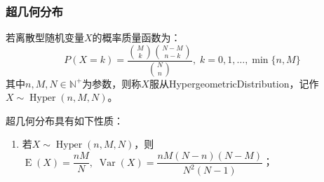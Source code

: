 \subsubsection{超几何分布}
\begin{definition}
	若离散型随机变量$X$的概率质量函数为：
	\begin{equation*}
		P(X=k)=\frac{\binom{M}{k}\binom{N-M}{n-k}}{\binom{N}{n}},\;k=0,1,\dots,\min\{n,M\}
	\end{equation*}
	其中$n,M,N\in\mathbb{N}^+$为参数，则称$X$服从\gls{HypergeometricDistribution}，记作$X\sim\operatorname{Hyper}(n,M,N)$。
\end{definition}
\begin{property}
	超几何分布具有如下性质：
	\begin{enumerate}
		\item 若$X\sim\operatorname{Hyper}(n,M,N)$，则$\operatorname{E}(X)=\dfrac{nM}{N},\;\operatorname{Var}(X)=\dfrac{nM(N-n)(N-M)}{N^2(N-1)}$；
	\end{enumerate}
\end{property}
